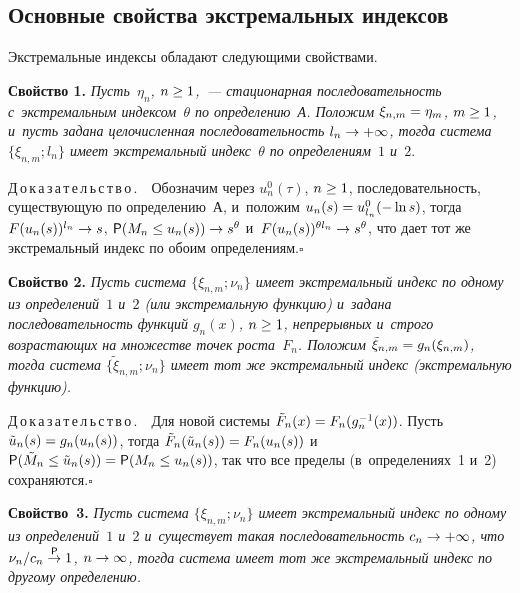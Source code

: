 \begin{multicols}{2}
\section{Основные свойства экстремальных индексов}

Экстремальные индексы обладают следующими свойствами.

\noindent
\textbf{Свойство 1.} \textit{Пусть~$\eta_n$, $n\hm\ge 1$,~---
стационарная последовательность с~экстремальным индексом~$\theta$ по определению~А.
Положим $\xi_{n,m}\hm=\eta_m$, $m\hm\ge 1$, и~пусть задана
целочисленная последовательность $l_n\hm\to +\infty$, тогда
система $\{\xi_{n,m};l_n\}$ имеет экстремальный индекс~$\theta$ по определениям~$1$
и~$2$}.

\smallskip

\noindent
Д\,о\,к\,а\,з\,а\,т\,е\,л\,ь\,с\,т\,в\,о\,.\ \
Обозначим через $u^0_n(\tau)$, $n\hm\ge 1$, последовательность,
существующую по определению~А,
и~положим $u_n(s)\hm=u^0_{l_n}(-\ln s)$, тогда
$F(u_n(s))^{l_n}\hm\to s$, ${\sf P}(M_n\hm\le u_n(s))\hm\to s^\theta$
и~$F(u_n(s))^{\theta l_n}\hm\to s^\theta$, что дает тот же
экстремальный индекс по обоим определениям.\hfill$\square$


\smallskip

\noindent
\textbf{Свойство 2.} \textit{Пусть система $\{\xi_{n,m};\nu_n\}$
имеет экстремальный индекс по одному из определений~$1$ и~$2$
(или экстремальную функцию) и~задана последовательность функций $g_n(x)$,
$n\hm \ge 1$, непрерывных и~строго возрастающих на множестве точек роста~$F_n$.
Положим ${\tilde\xi}_{n,m}\hm=g_n(\xi_{n,m})$, тогда система
$\{{\tilde\xi}_{n,m};\nu_n\}$
имеет тот же экстремальный индекс (экстремальную функцию).}


\smallskip

\noindent
Д\,о\,к\,а\,з\,а\,т\,е\,л\,ь\,с\,т\,в\,о\,.\ \
Для новой системы ${\tilde F}_n(x)\hm=F_n(g^{-1}_n(x))$. Пусть
${\tilde u}_n(s)\hm=g_n(u_n(s))$,
тогда ${\tilde F}_n({\tilde u}_n(s))\hm=F_n(u_n(s))$
и~${\sf P}({\tilde M}_n\le {\tilde u}_n(s))\hm=
{\sf P}(M_n\hm\le u_n(s))$, так что все пределы (в~определениях~1 и~2)
сохраняются.\hfill$\square$

\smallskip

\noindent
\textbf{Свойство~3.} \textit{Пусть система $\{\xi_{n,m};\nu_n\}$
имеет экстремальный индекс по одному из определений~$1$ и~$2$
и~существует такая последовательность $c_n\hm\to +\infty$, что
$\nu_n/c_n\stackrel{{\sf P}}{\to} 1$, $n\hm\to\infty$, тогда система имеет тот
же экстремальный индекс по другому определению.}


\end{multicols}
